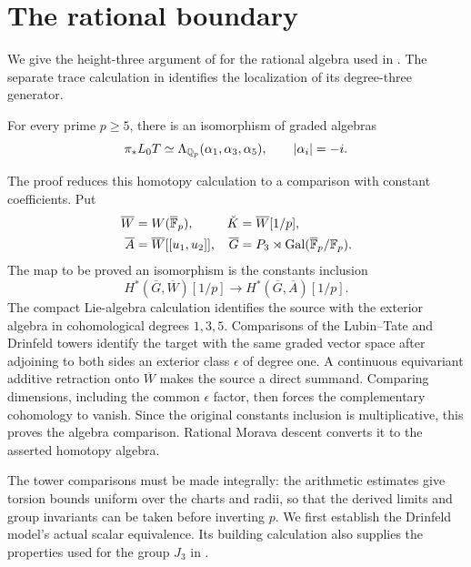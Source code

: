 \section{The rational boundary}\label{h3:app:rational-boundary}

We give the height-three argument of
\cite[Sections~2.5--2.6 and 3.9--6.3]{BSSW} for the rational algebra
used in .  The separate trace
calculation in  identifies the localization of
its degree-three generator.

\begin{proposition}\label{h3:prop:rational-boundary}
For every prime \(p\geq5\), there is an isomorphism of graded algebras
\[
 \pi_*L_0T\simeq\Lambda_{\mathbb Q_p}(\alpha_1,\alpha_3,\alpha_5),
 \qquad |\alpha_i|=-i.
\]
\end{proposition}

The proof reduces this homotopy calculation to a comparison with
constant coefficients.  Put
\[
 \begin{aligned}
 \overline W&=W(\overline{\mathbb F}_p),&
 \breve K&=\overline W[1/p],\\
 \overline A&=\overline W[[u_1,u_2]],&
 \overline G&=P_3\rtimes\operatorname{Gal}(\overline{\mathbb F}_p/\mathbb F_p).
 \end{aligned}
\]
The map to be proved an isomorphism is the constants inclusion
\begin{equation}\label{h3:eq:rational-boundary-constants}
 H^*(\overline G,\overline W)[1/p]
 \longrightarrow H^*(\overline G,\overline A)[1/p].
\end{equation}
The compact Lie-algebra calculation identifies the source with the
exterior algebra in cohomological degrees $1,3,5$.  Comparisons of
the Lubin--Tate and Drinfeld towers identify the target with the
same graded vector space after adjoining to both sides an exterior
class $\epsilon$ of degree one.  A continuous equivariant additive
retraction onto $\overline W$ makes the source a direct summand.
Comparing dimensions, including the common $\epsilon$ factor,
then forces the complementary cohomology to vanish.  Since the
original constants inclusion is multiplicative, this proves the
algebra comparison.  Rational Morava descent converts it to the
asserted homotopy algebra.

The tower comparisons must be made integrally: the arithmetic
estimates give torsion bounds uniform over the charts and radii,
so that the derived limits and group invariants can be taken before
inverting $p$.  We first establish the Drinfeld model's actual
scalar equivalence.  Its building calculation also supplies the
properties used for the group $J_3$ in .

